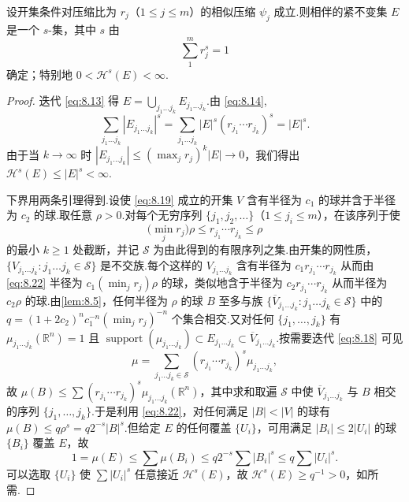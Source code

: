 \begin{theorem}\label{thm:8.6}
设开集条件对压缩比为 $r_j$（$1\leq j\leq m$）的相似压缩 $\psi_j$ 成立.则相伴的紧不变集 $E$ 是一个 $s$-集，其中 $s$ 由
\begin{equation}\label{eq:8.21}
  \sum_{1}^{m}r_j^{s}=1
\end{equation}
确定；特别地 $0<\mathcal{H}^s(E)<\infty$.
\end{theorem}

\begin{proof}
迭代 \eqref{eq:8.13} 得 $E=\bigcup_{j_1\ldots j_k}E_{j_1\ldots j_k}$.由 \eqref{eq:8.14},
\[
  \sum_{j_1\ldots j_k}|E_{j_1\ldots j_k}|^{s}
  =\sum_{j_1\ldots j_k}|E|^{s}(r_{j_1}\cdots r_{j_k})^{s}
  =|E|^{s}.
\]
由于当 $k\to\infty$ 时 $|E_{j_1\ldots j_k}|\leq(\max_j r_j)^k|E|\to 0$，我们得出 $\mathcal{H}^s(E)\leq|E|^s<\infty$.

下界用两条引理得到.设使 \eqref{eq:8.19} 成立的开集 $V$ 含有半径为 $c_1$ 的球并含于半径为 $c_2$ 的球.取任意 $\rho>0$.对每个无穷序列 $\{j_1,j_2,\ldots\}$（$1\leq j_i\leq m$），在该序列于使
\begin{equation}\label{eq:8.22}
  \bigl(\min_{j}r_j\bigr)\rho\leq r_{j_1}\cdots r_{j_k}\leq\rho
\end{equation}
的最小 $k\geq 1$ 处截断，并记 $\mathcal{S}$ 为由此得到的有限序列之集.由开集的网性质，$\{V_{j_1\ldots j_k}:j_1\ldots j_k\in\mathcal{S}\}$ 是不交族.每个这样的 $V_{j_1\ldots j_k}$ 含有半径为 $c_1r_{j_1}\cdots r_{j_k}$ 从而由 \eqref{eq:8.22} 半径为 $c_1(\min_j r_j)\rho$ 的球，类似地含于半径为 $c_2r_{j_1}\cdots r_{j_k}$ 从而半径为 $c_2\rho$ 的球.由\cref{lem:8.5}，任何半径为 $\rho$ 的球 $B$ 至多与族 $\{\overline{V}_{j_1\ldots j_k}:j_1\ldots j_k\in\mathcal{S}\}$ 中的 $q=(1+2c_2)^n c_1^{-n}(\min_j r_j)^{-n}$ 个集合相交.又对任何 $\{j_1,\ldots,j_k\}$ 有 $\mu_{j_1\ldots j_k}(\mathbb{R}^n)=1$ 且 $\operatorname{support}(\mu_{j_1\ldots j_k})\subset E_{j_1\ldots j_k}\subset\overline{V}_{j_1\ldots j_k}$.按需要迭代 \eqref{eq:8.18} 可见
\[
  \mu=\sum_{j_1\ldots j_k\in\mathcal{S}}(r_{j_1}\cdots r_{j_k})^{s}\mu_{j_1\ldots j_k},
\]
故 $\mu(B)\leq\sum(r_{j_1}\cdots r_{j_k})^s\mu_{j_1\ldots j_k}(\mathbb{R}^n)$，其中求和取遍 $\mathcal{S}$ 中使 $\overline{V}_{j_1\ldots j_k}$ 与 $B$ 相交的序列 $\{j_1,\ldots,j_k\}$.于是利用 \eqref{eq:8.22}，对任何满足 $|B|<|V|$ 的球有 $\mu(B)\leq q\rho^s=q2^{-s}|B|^s$.但给定 $E$ 的任何覆盖 $\{U_i\}$，可用满足 $|B_i|\leq 2|U_i|$ 的球 $\{B_i\}$ 覆盖 $E$，故
\[
  1=\mu(E)\leq\sum\mu(B_i)\leq q2^{-s}\sum|B_i|^{s}\leq q\sum|U_i|^{s}.
\]
可以选取 $\{U_i\}$ 使 $\sum|U_i|^s$ 任意接近 $\mathcal{H}^s(E)$，故 $\mathcal{H}^s(E)\geq q^{-1}>0$，如所需.
\end{proof}

